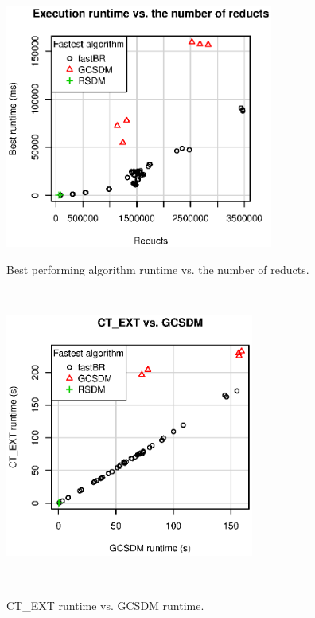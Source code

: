 \documentclass[authoryear,11pt]{elsarticle}
\begin{document}
	\begin{figure}[htb]
	\begin{minipage}{.48\textwidth}
	    \begin{center}
	       \includegraphics[height=8cm]{runtimeReducts.eps}
	    \end{center}
	\caption{Best performing algorithm runtime vs. the number of reducts.}
	\label{fig:TimeReducts}
	\end{minipage}%
	~
	\begin{minipage}{.48\textwidth}
	    \begin{center}
	       \includegraphics[height=8cm]{scatter_CTvsGAP.eps}
	    \end{center}
	\caption{CT\_EXT runtime vs. GCSDM runtime.}
	\label{fig:CTvsGAP}
	~
	\end{minipage}	
	\end{figure}		
	
\end{document}
